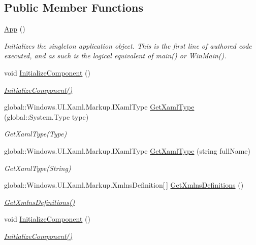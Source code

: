 \subsection*{Public Member Functions}
\begin{DoxyCompactItemize}
\item 
\hyperlink{class_test_app_h_l_1_1_universal_windows_1_1_app_a2a48f5de0651c87570391fe3764a5406}{App} ()
\begin{DoxyCompactList}\small\item\em Initializes the singleton application object. This is the first line of authored code executed, and as such is the logical equivalent of main() or Win\+Main(). \end{DoxyCompactList}\item 
void \hyperlink{class_test_app_h_l_1_1_universal_windows_1_1_app_a74580ee39336efc1a3e242c5a551dfcf}{Initialize\+Component} ()
\begin{DoxyCompactList}\small\item\em \hyperlink{class_test_app_h_l_1_1_universal_windows_1_1_app_a74580ee39336efc1a3e242c5a551dfcf}{Initialize\+Component()} \end{DoxyCompactList}\item 
global\+::\+Windows.\+U\+I.\+Xaml.\+Markup.\+I\+Xaml\+Type \hyperlink{class_test_app_h_l_1_1_universal_windows_1_1_app_ac539227e51d08baeb49ec1f0a4d63eeb}{Get\+Xaml\+Type} (global\+::\+System.\+Type type)
\begin{DoxyCompactList}\small\item\em Get\+Xaml\+Type(\+Type) \end{DoxyCompactList}\item 
global\+::\+Windows.\+U\+I.\+Xaml.\+Markup.\+I\+Xaml\+Type \hyperlink{class_test_app_h_l_1_1_universal_windows_1_1_app_a752453000595df20a053b1a8157c4ddb}{Get\+Xaml\+Type} (string full\+Name)
\begin{DoxyCompactList}\small\item\em Get\+Xaml\+Type(\+String) \end{DoxyCompactList}\item 
global\+::\+Windows.\+U\+I.\+Xaml.\+Markup.\+Xmlns\+Definition\mbox{[}$\,$\mbox{]} \hyperlink{class_test_app_h_l_1_1_universal_windows_1_1_app_a13d43b568978e539c3d7b0334d12097d}{Get\+Xmlns\+Definitions} ()
\begin{DoxyCompactList}\small\item\em \hyperlink{class_test_app_h_l_1_1_universal_windows_1_1_app_a13d43b568978e539c3d7b0334d12097d}{Get\+Xmlns\+Definitions()} \end{DoxyCompactList}\item 
void \hyperlink{class_test_app_h_l_1_1_universal_windows_1_1_app_a74580ee39336efc1a3e242c5a551dfcf}{Initialize\+Component} ()
\begin{DoxyCompactList}\small\item\em \hyperlink{class_test_app_h_l_1_1_universal_windows_1_1_app_a74580ee39336efc1a3e242c5a551dfcf}{Initialize\+Component()} \end{DoxyCompactList}\end{DoxyCompactItemize}
